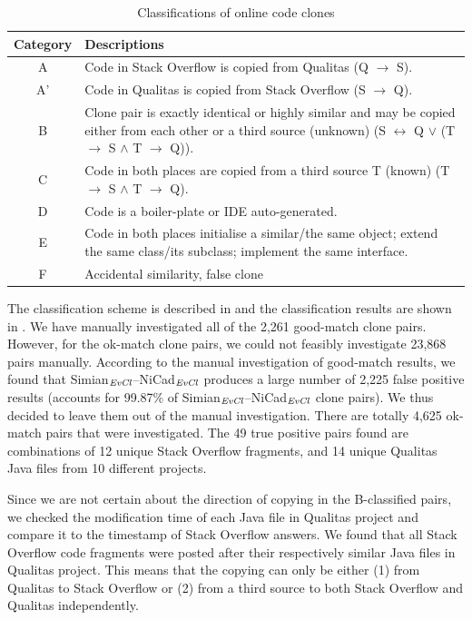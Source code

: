 \documentclass{sig-alternate-05-2015}
\begin{document}
\begin{table}
	\centering
	\caption{Classifications of online code clones}
	\label{tab:classification_scheme}
	\begin{tabular}{|c|p{13cm}|}
		\hline 
		Category & Descriptions \\ 
		\hline 
		A & Code in Stack Overflow is copied from Qualitas (Q $\rightarrow$ S). \\ 
		\hline 
		A' & Code in Qualitas is copied from Stack Overflow (S $\rightarrow$ Q). \\ 
		\hline 
		B & Clone pair is exactly identical or highly similar and may be copied either from each other or a third source (unknown) (S $\leftrightarrow$ Q $\vee$ (T $\rightarrow$ S $\wedge$ T $\rightarrow$ Q)).
		\\ 
		\hline 
		C & Code in both places are copied from a third source T (known) (T $\rightarrow$ S $\wedge$ T $\rightarrow$ Q).
		\\ 
		\hline 
		D & Code is a boiler-plate or IDE auto-generated.
		\\ 
		\hline 
		E & Code in both places initialise a similar/the same object; extend the same class/its subclass; implement the same interface.
		\\ 
		\hline 
		F & Accidental similarity, false clone \\ 
		\hline 
	\end{tabular} 
\end{table}

The classification scheme is described in  and the classification results are shown in . We have manually investigated all of the 2,261 good-match clone pairs.  However, for the ok-match clone pairs, we could not feasibly investigate 23,868 pairs manually.  According to the manual investigation of good-match results, we found that Simian$_{\textrm{\textit{EvCl}}}$--NiCad$_{\textrm{\textit{EvCl}}}$ produces a large number of 2,225 false positive results (accounts for 99.87\% of Simian$_{\textrm{\textit{EvCl}}}$--NiCad$_{\textrm{\textit{EvCl}}}$ clone pairs). We thus decided to leave them out of the manual investigation. There are totally 4,625 ok-match pairs that were investigated. The 49 true positive pairs found are combinations of 12 unique Stack Overflow fragments, and 14 unique Qualitas Java files from 10 different projects.

Since we are not certain about the direction of copying in the B-classified pairs, we checked the modification time of each Java file in Qualitas project and compare it to the timestamp of Stack Overflow answers. We found that all Stack Overflow code fragments were posted after their respectively similar Java files in Qualitas project. This means that the copying can only be either (1) from Qualitas to Stack Overflow or (2) from a third source to both Stack Overflow and Qualitas independently.
\end{document}
